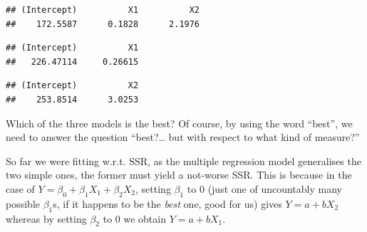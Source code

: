 \documentclass[10pt,b5paper,krantz1]{krantz}
\newenvironment{Shaded}{\begin{snugshade}}{\end{snugshade}}
\newcommand{\CommentTok}[1]{\textcolor[rgb]{0.37,0.37,0.37}{\textit{#1}}}
\newcommand{\KeywordTok}[1]{\textcolor[rgb]{0.27,0.27,0.27}{\textbf{#1}}}
\newcommand{\NormalTok}[1]{#1}
\newcommand{\OperatorTok}[1]{\textcolor[rgb]{0.43,0.43,0.43}{\textbf{#1}}}
\newcommand{\StringTok}[1]{\textcolor[rgb]{0.5,0.5,0.5}{#1}}
\begin{document}
\begin{Shaded}
\end{Shaded}

\begin{verbatim}
## (Intercept)          X1          X2 
##    172.5587      0.1828      2.1976
\end{verbatim}

\begin{Shaded}
\end{Shaded}

\begin{verbatim}
## (Intercept)          X1 
##   226.47114     0.26615
\end{verbatim}

\begin{Shaded}
\end{Shaded}

\begin{verbatim}
## (Intercept)          X2 
##    253.8514      3.0253
\end{verbatim}

Which of the three models is the best?
Of course, by using the word ``best'',
we need to answer the question ``best?\ldots{} but with respect to what kind of measure?''

So far we were fitting w.r.t. SSR,
as the multiple regression model generalises the two simple ones,
the former must yield a not-worse SSR.
This is because in the case of \(Y=\beta_0 + \beta_1 X_1 + \beta_2 X_2\),
setting \(\beta_1\) to 0 (just one of uncountably many possible \(\beta_1\)s,
if it happens to be the \emph{best} one, good for us)
gives \(Y=a + b X_2\)
whereas by setting \(\beta_2\) to 0 we obtain \(Y=a + b X_1\).
\end{document}
